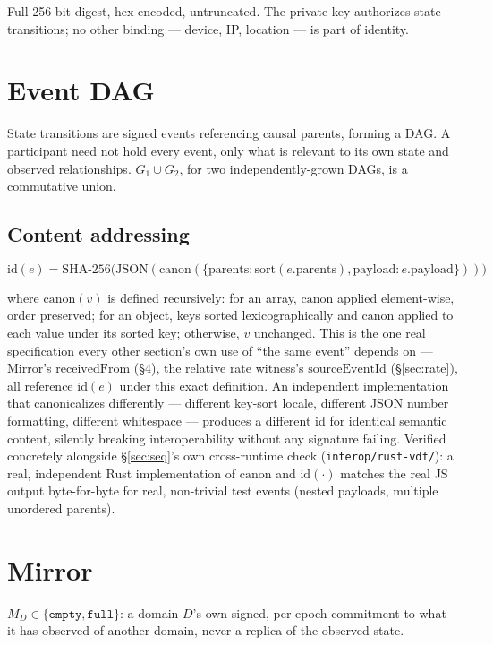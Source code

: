 \documentclass[10pt]{article}
\newcommand{\code}[1]{\texttt{\small #1}}
\begin{document}
Full 256-bit digest, hex-encoded, untruncated. The private key authorizes state transitions; no other binding --- device, IP, location --- is part of identity.

\section{Event DAG}

State transitions are signed events referencing causal parents, forming a DAG. A participant need not hold every event, only what is relevant to its own state and observed relationships. $G_1 \cup G_2$, for two independently-grown DAGs, is a commutative union.

\subsection{Content addressing}
\label{sec:content-addressing}

\[
\mathrm{id}(e) = \mathrm{SHA\text{-}256}\big(\mathrm{JSON}(\mathrm{canon}(\{\mathrm{parents}: \mathrm{sort}(e.\mathrm{parents}), \mathrm{payload}: e.\mathrm{payload}\}))\big)
\]

where $\mathrm{canon}(v)$ is defined recursively: for an array, $\mathrm{canon}$ applied element-wise, order preserved; for an object, keys sorted lexicographically and $\mathrm{canon}$ applied to each value under its sorted key; otherwise, $v$ unchanged. This is the one real specification every other section's own use of ``the same event'' depends on --- Mirror's $\mathrm{receivedFrom}$ (\S4), the relative rate witness's $\mathrm{sourceEventId}$ (\S\ref{sec:rate}), all reference $\mathrm{id}(e)$ under this exact definition. An independent implementation that canonicalizes differently --- different key-sort locale, different JSON number formatting, different whitespace --- produces a different id for identical semantic content, silently breaking interoperability without any signature failing. Verified concretely alongside \S\ref{sec:seq}'s own cross-runtime check (\code{interop/rust-vdf/}): a real, independent Rust implementation of $\mathrm{canon}$ and $\mathrm{id}(\cdot)$ matches the real JS output byte-for-byte for real, non-trivial test events (nested payloads, multiple unordered parents).

\section{Mirror}

$M_D \in \{\texttt{empty}, \texttt{full}\}$: a domain $D$'s own signed, per-epoch commitment to what it has observed of another domain, never a replica of the observed state.
\end{document}
